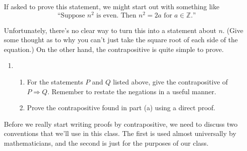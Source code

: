 \documentclass[12 pt]{article}
\newcommand{\Z}{\mathbb{Z}}
\theoremstyle{definition}
\theoremstyle{plain}
\theoremstyle{mytheorem}
\theoremstyle{myexample}
\theoremstyle{mydefinition}
\begin{document}
If asked to prove this statement, we might start out with something like 
\[\mbox{``Suppose $n^2$ is even.  Then $n^2=2a$ for $a \in \Z$.''}\]

Unfortunately, there's no clear way to turn this into a statement about $n$.  (Give some thought as to why you can't just take the square root of each side of the equation.)  On the other hand, the contrapositive is quite simple to prove.
	\begin{enumerate}[resume]
		\item \begin{enumerate}
		\item  For the statements $P$ and $Q$ listed above, give the contrapositive of $P \Rightarrow Q$.  Remember to restate the negations in a useful manner.
		\vspace{1.5in}
		\item Prove the contrapositive found in part (a) using a direct proof.
		\vspace{3in}
		\end{enumerate}
	\end{enumerate}
	
\noindent Before we really start writing proofs by contrapositive, we need to discuss two conventions that we'll use in this class.  The first is used almost universally by mathematicians, and the second is just for the purposes of our class.\\
\end{document}
